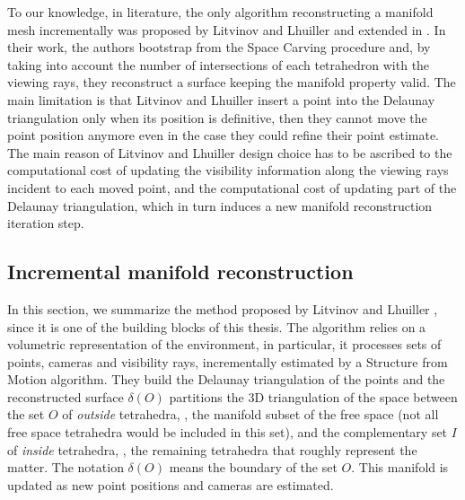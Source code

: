 To our knowledge, in literature, the only algorithm reconstructing a manifold mesh incrementally was proposed by Litvinov and Lhuiller \cite{litvinov_lhuillier_13,litvinov_Lhiuller14} and extended in \cite{romanoni15a,romanoni15b}. 
In their work, the authors  bootstrap from the Space Carving procedure and, by taking into account the number of intersections of each tetrahedron with the viewing rays, they reconstruct a surface keeping the manifold property valid. 
The main limitation is that  Litvinov and Lhuiller insert a point into the Delaunay triangulation only when its position is definitive, then they cannot move the point position anymore even in the case they could refine their point  estimate. 
The main reason of Litvinov and Lhuiller design choice has to be ascribed to the computational cost of updating the visibility information along the viewing rays incident to each moved point, and the computational cost of updating part of the Delaunay triangulation, which in turn induces a new manifold reconstruction iteration step.

\subsection{Incremental manifold reconstruction}
\label{subsec:incrementalManifold_2}
In this section, we summarize the method proposed  by Litvinov and Lhuiller \cite{litvinov_lhuillier_13,litvinov_Lhiuller14}, since it is one of the building blocks of this thesis.
The algorithm relies on a volumetric representation of the environment, in particular, it processes sets of points, cameras and visibility rays,  incrementally estimated by a Structure from Motion algorithm. 
They build the Delaunay triangulation of the points and the reconstructed surface $\delta( O)$ partitions  the 3D triangulation of the space between the set $O$ of \emph{outside} tetrahedra, \ie, the manifold subset of the free space (not all free space tetrahedra would be included in this set), and the complementary set $I$ of \emph{inside} tetrahedra, \ie, the remaining tetrahedra that roughly represent the matter. The notation $\delta( O)$ means the boundary  of the set $O$.
This manifold is updated as new point positions and cameras are estimated. 

